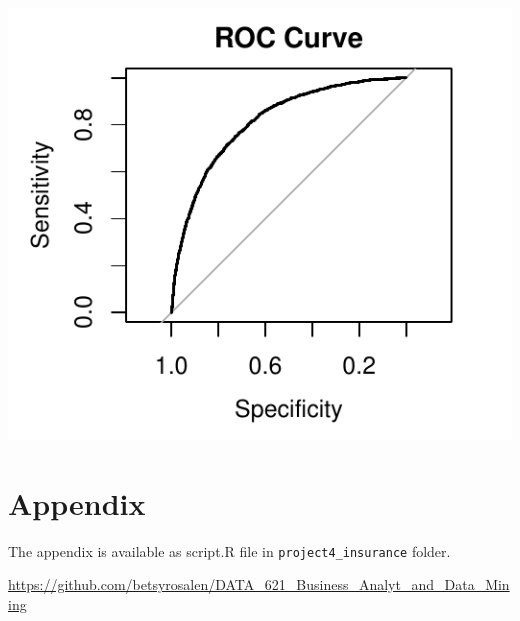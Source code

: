 \documentclass[]{article}
\begin{document}
\includegraphics{proj4_files/figure-latex/unnamed-chunk-7-1.pdf}

\newpage

\section{Appendix}\label{appendix}

The appendix is available as script.R file in
\texttt{project4\_insurance} folder.

\url{https://github.com/betsyrosalen/DATA_621_Business_Analyt_and_Data_Mining}
\end{document}
